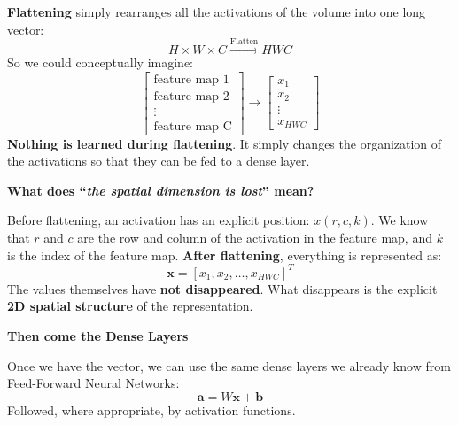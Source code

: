 \highspace
\textcolor{Green3}{ \textbf{Flattening}} simply rearranges all the activations of the volume into one long vector:
\begin{equation*}
    H \times W \times C \xrightarrow{\text{Flatten}} HWC
\end{equation*}
So we could conceptually imagine:
\begin{equation*}
    \begin{bmatrix}
        \text{feature map 1} \\
        \text{feature map 2} \\
        \vdots \\
        \text{feature map C}
    \end{bmatrix}
    \to
    \begin{bmatrix}
        x_1 \\
        x_2 \\
        \vdots \\
        x_{HWC}
    \end{bmatrix}
\end{equation*}
\textbf{Nothing is learned during flattening}. It simply changes the organization of the activations so that they can be fed to a dense layer.

\highspace
\begin{flushleft}
    \textcolor{Green3}{ \textbf{What does ``\emph{the spatial dimension is lost}'' mean?}}
\end{flushleft}
Before flattening, an activation has an explicit position: $x(r, c, k)$. We know that $r$ and $c$ are the row and column of the activation in the feature map, and $k$ is the index of the feature map. \textbf{After flattening}, everything is represented as:
\begin{equation*}
    \mathbf{x} = \left[ x_{1}, x_{2}, \ldots, x_{HWC} \right]^{T}
\end{equation*}
The values themselves have \textbf{not disappeared}. What disappears is the explicit \textbf{2D spatial structure} of the representation.

\highspace
\begin{flushleft}
    \textcolor{Green3}{ \textbf{Then come the Dense Layers}}
\end{flushleft}
Once we have the vector, we can use the same dense layers we already know from Feed-Forward Neural Networks:
\begin{equation*}
    \mathbf{a} = W\mathbf{x} + \mathbf{b}
\end{equation*}
Followed, where appropriate, by activation functions.

